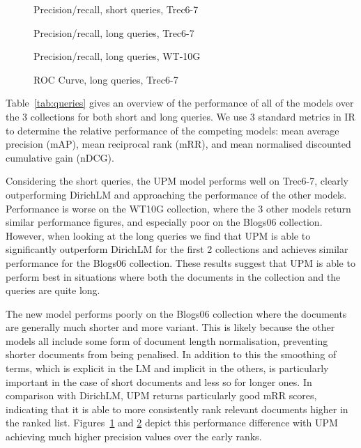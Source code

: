 \begin{figure}[h]
\centering
\caption{Precision/recall, short queries, Trec6-7}
\label{fig:trecshort}
\end{figure}

\begin{figure}[h]
\centering
\caption{Precision/recall, long queries, Trec6-7}
\label{fig:treclong}
\end{figure}

\begin{figure}[h]
\centering
\caption{Precision/recall, long queries, WT-10G}
\end{figure}


\begin{figure}[h]
\centering
\caption{ROC Curve, long queries, Trec6-7}
\label{fig:treclongroc}
\end{figure}

Table~\ref{tab:queries} gives an overview of the performance of all of the models over the 3 collections for both short and long queries. We use 3 standard metrics in IR to determine the relative performance of the competing models: mean average precision (mAP), mean reciprocal rank (mRR), and mean normalised discounted cumulative gain (nDCG).

Considering the short queries, the UPM model performs well on Trec6-7, clearly outperforming DirichLM and approaching the performance of the other models. Performance is worse on the WT10G collection, where the 3 other models return similar performance figures, and especially poor on the Blogs06 collection. However, when looking at the long queries we find that UPM is able to significantly outperform DirichLM for the first 2 collections and achieves similar performance for the Blogs06 collection. These results suggest that UPM is able to perform best in situations where both the documents in the collection and the queries are quite long. 

The new model performs poorly on the Blogs06 collection where the documents are generally much shorter and more variant. This is likely because the other models all include some form of document length normalisation, preventing shorter documents from being penalised. In addition to this the smoothing of terms, which is explicit in the LM and implicit in the others, is particularly important in the case of short documents and less so for longer ones. In comparison with DirichLM, UPM returns particularly good mRR scores, indicating that it is able to more consistently rank relevant documents higher in the ranked list. Figures~\ref{fig:trecshort} and \ref{fig:treclong} depict this performance difference with UPM achieving much higher precision values over the early ranks.

